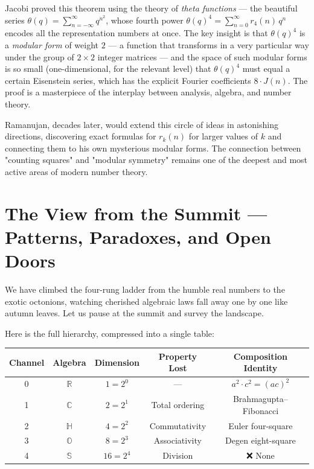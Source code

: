 Jacobi proved this theorem using the theory of \textit{theta functions} --- the beautiful series $\theta(q) = \sum_{n=-\infty}^{\infty} q^{n^2}$, whose fourth power $\theta(q)^4 = \sum_{n=0}^{\infty} r_4(n)\, q^n$ encodes all the representation numbers at once. The key insight is that $\theta(q)^4$ is a \textit{modular form} of weight $2$ --- a function that transforms in a very particular way under the group of $2 \times 2$ integer matrices --- and the space of such modular forms is so small (one-dimensional, for the relevant level) that $\theta(q)^4$ must equal a certain Eisenstein series, which has the explicit Fourier coefficients $8 \cdot J(n)$. The proof is a masterpiece of the interplay between analysis, algebra, and number theory.

Ramanujan, decades later, would extend this circle of ideas in astonishing directions, discovering exact formulas for $r_k(n)$ for larger values of $k$ and connecting them to his own mysterious modular forms. The connection between "counting squares" and "modular symmetry" remains one of the deepest and most active areas of modern number theory.

\bigskip

\section*{The View from the Summit --- Patterns, Paradoxes, and Open Doors}

We have climbed the four-rung ladder from the humble real numbers to the exotic octonions, watching cherished algebraic laws fall away one by one like autumn leaves. Let us pause at the summit and survey the landscape.

Here is the full hierarchy, compressed into a single table:

\begin{center}
\small
\begin{tabular}{c c c c c}
\toprule
Channel & Algebra & Dimension & Property Lost & Composition Identity \\
\midrule
0 & $\mathbb{R}$ & $1 = 2^0$ & --- & $a^2 \cdot c^2 = (ac)^2$ \\
1 & $\mathbb{C}$ & $2 = 2^1$ & Total ordering & Brahmagupta--Fibonacci \\
2 & $\mathbb{H}$ & $4 = 2^2$ & Commutativity & Euler four-square \\
3 & $\mathbb{O}$ & $8 = 2^3$ & Associativity & Degen eight-square \\
4 & $\mathbb{S}$ & $16 = 2^4$ & Division & ❌ None \\
\bottomrule
\end{tabular}
\end{center}


